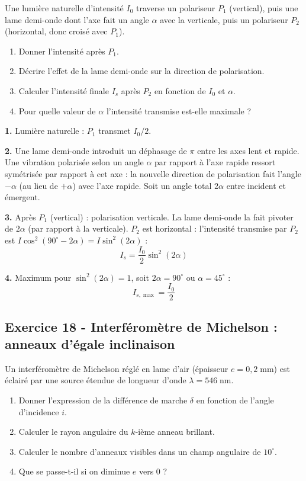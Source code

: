 \documentclass[12pt,a4paper]{article}
\begin{document}
\begin{boiteexercice}
Une lumière naturelle d'intensité $I_0$ traverse un polariseur $P_1$ (vertical), puis une lame demi-onde dont l'axe fait un angle $\alpha$ avec la verticale, puis un polariseur $P_2$ (horizontal, donc croisé avec $P_1$).
\begin{enumerate}
  \item Donner l'intensité après $P_1$.
  \item Décrire l'effet de la lame demi-onde sur la direction de polarisation.
  \item Calculer l'intensité finale $I_s$ après $P_2$ en fonction de $I_0$ et $\alpha$.
  \item Pour quelle valeur de $\alpha$ l'intensité transmise est-elle maximale ?
\end{enumerate}
\end{boiteexercice}

\begin{boitecorrige}
\textbf{1.} Lumière naturelle : $P_1$ transmet $I_0/2$.

\textbf{2.} Une lame demi-onde introduit un déphasage de $\pi$ entre les axes lent et rapide. Une vibration polarisée selon un angle $\alpha$ par rapport à l'axe rapide ressort symétrisée par rapport à cet axe : la nouvelle direction de polarisation fait l'angle $-\alpha$ (au lieu de $+\alpha$) avec l'axe rapide. Soit un angle total $2\alpha$ entre incident et émergent.

\textbf{3.} Après $P_1$ (vertical) : polarisation verticale. La lame demi-onde la fait pivoter de $2\alpha$ (par rapport à la verticale). $P_2$ est horizontal : l'intensité transmise par $P_2$ est $I\cos^2(90^\circ - 2\alpha) = I\sin^2(2\alpha)$ :
\[
I_s = \frac{I_0}{2}\sin^2(2\alpha)
\]

\textbf{4.} Maximum pour $\sin^2(2\alpha) = 1$, soit $2\alpha = 90^\circ$ ou $\alpha = 45^\circ$ :
\[
I_{s,\max} = \frac{I_0}{2}
\]
\end{boitecorrige}

\subsection*{Exercice 18 - Interféromètre de Michelson : anneaux d'égale inclinaison \niveau{\difficile}}

\begin{boiteexercice}
Un interféromètre de Michelson réglé en lame d'air (épaisseur $e = 0{,}2\;\text{mm}$) est éclairé par une source étendue de longueur d'onde $\lambda = 546\;\text{nm}$.
\begin{enumerate}
  \item Donner l'expression de la différence de marche $\delta$ en fonction de l'angle d'incidence $i$.
  \item Calculer le rayon angulaire du $k$-ième anneau brillant.
  \item Calculer le nombre d'anneaux visibles dans un champ angulaire de $10^\circ$.
  \item Que se passe-t-il si on diminue $e$ vers 0 ?
\end{enumerate}
\end{boiteexercice}
\end{document}
